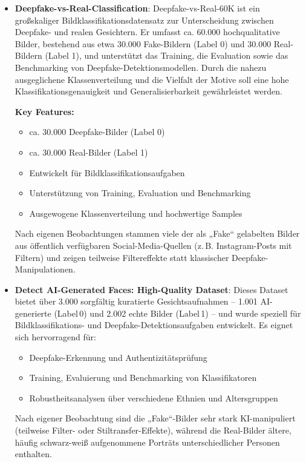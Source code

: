 \begin{itemize}
    \item \textbf{Deepfake-vs-Real-Classification}\cite{prithivmlmods_2025}:  
    Deepfake-vs-Real-60K ist ein großskaliger Bildklassifikationsdatensatz zur Unterscheidung zwischen Deepfake- und realen Gesichtern. Er umfasst ca. 60.000 hochqualitative Bilder, bestehend aus etwa 30.000 Fake-Bildern (Label 0) und 30.000 Real-Bildern (Label 1), und unterstützt das Training, die Evaluation sowie das Benchmarking von Deepfake-Detektionsmodellen. Durch die nahezu ausgeglichene Klassenverteilung und die Vielfalt der Motive soll eine hohe Klassifikationsgenauigkeit und Generalisierbarkeit gewährleistet werden.
    
    \textbf{Key Features:}
    \begin{itemize}
        \item ca. 30.000 Deepfake-Bilder (Label 0)
        \item ca. 30.000 Real-Bilder (Label 1)
        \item Entwickelt für Bildklassifikationsaufgaben
        \item Unterstützung von Training, Evaluation und Benchmarking
        \item Ausgewogene Klassenverteilung und hochwertige Samples
    \end{itemize}
    
    Nach eigenen Beobachtungen stammen viele der als „Fake“ gelabelten Bilder aus öffentlich verfügbaren Social-Media-Quellen (z.\,B. Instagram-Posts mit Filtern) und zeigen teilweise Filtereffekte statt klassischer Deepfake-Manipulationen.

      \item \textbf{Detect AI-Generated Faces: High-Quality Dataset}\cite{shahzaibshazoo2025}:  
  Dieses Dataset bietet über 3.000 sorgfältig kuratierte Gesichtsaufnahmen – 1.001 AI-generierte (Label\,0) und 2.002 echte Bilder (Label\,1) – und wurde speziell für Bildklassifikations- und Deepfake-Detektionsaufgaben entwickelt. Es eignet sich hervorragend für:
  \begin{itemize}
    \item Deepfake-Erkennung und Authentizitätsprüfung
    \item Training, Evaluierung und Benchmarking von Klassifikatoren
    \item Robustheitsanalysen über verschiedene Ethnien und Altersgruppen
  \end{itemize}
  Nach eigener Beobachtung sind die „Fake“-Bilder sehr stark KI-manipuliert (teilweise Filter- oder Stiltransfer-Effekte), während die Real-Bilder ältere, häufig schwarz-weiß aufgenommene Porträts unterschiedlicher Personen enthalten.



\end{itemize}
